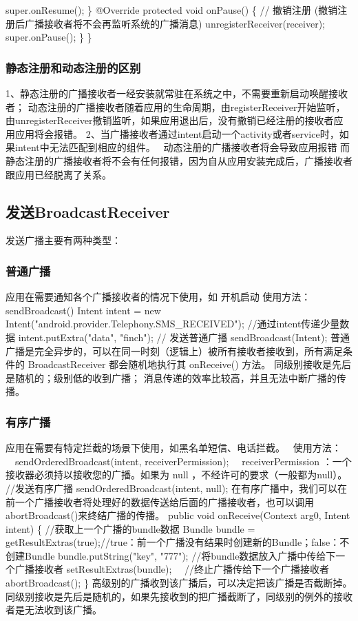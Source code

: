 \documentclass[9pt, b5paper]{article}
\begin{document}
        super.onResume();
    \}
    @Override
    protected void onPause() \{  
        // 撤销注册 (撤销注册后广播接收者将不会再监听系统的广播消息)
        unregisterReceiver(receiver);
        super.onPause();
    \}
\}
\subsubsection{静态注册和动态注册的区别}
\label{sec-13-3-3}
1、静态注册的广播接收者一经安装就常驻在系统之中，不需要重新启动唤醒接收者；
动态注册的广播接收者随着应用的生命周期，由registerReceiver开始监听，由unregisterReceiver撤销监听，如果应用退出后，没有撤销已经注册的接收者应用应用将会报错。
2、当广播接收者通过intent启动一个activity或者service时，如果intent中无法匹配到相应的组件。　
动态注册的广播接收者将会导致应用报错
而静态注册的广播接收者将不会有任何报错，因为自从应用安装完成后，广播接收者跟应用已经脱离了关系。　
\subsection{发送BroadcastReceiver}
\label{sec-13-4}
发送广播主要有两种类型：
\subsubsection{普通广播}
\label{sec-13-4-1}

 应用在需要通知各个广播接收者的情况下使用，如 开机启动
使用方法：sendBroadcast() 
Intent intent = new Intent("android.provider.Telephony.SMS\_RECEIVED"); 
//通过intent传递少量数据
intent.putExtra("data", "finch"); 
// 发送普通广播
sendBroadcast(Intent); 
普通广播是完全异步的，可以在同一时刻（逻辑上）被所有接收者接收到，所有满足条件的 BroadcastReceiver 都会随机地执行其 onReceive() 方法。
同级别接收是先后是随机的；级别低的收到广播；
消息传递的效率比较高，并且无法中断广播的传播。

\subsubsection{有序广播}
\label{sec-13-4-2}
应用在需要有特定拦截的场景下使用，如黑名单短信、电话拦截。　
使用方法：
　sendOrderedBroadcast(intent, receiverPermission);
　receiverPermission ：一个接收器必须持以接收您的广播。如果为 null ，不经许可的要求（一般都为null）。
//发送有序广播
 sendOrderedBroadcast(intent, null);
在有序广播中，我们可以在前一个广播接收者将处理好的数据传送给后面的广播接收者，也可以调用abortBroadcast()来终结广播的传播。
public void onReceive(Context arg0, Intent intent) \{
//获取上一个广播的bundle数据
Bundle bundle = getResultExtras(true);//true：前一个广播没有结果时创建新的Bundle；false：不创建Bundle
bundle.putString("key", "777");
//将bundle数据放入广播中传给下一个广播接收者
setResultExtras(bundle);　
//终止广播传给下一个广播接收者
abortBroadcast();
\}
高级别的广播收到该广播后，可以决定把该广播是否截断掉。
同级别接收是先后是随机的，如果先接收到的把广播截断了，同级别的例外的接收者是无法收到该广播。
\end{document}
